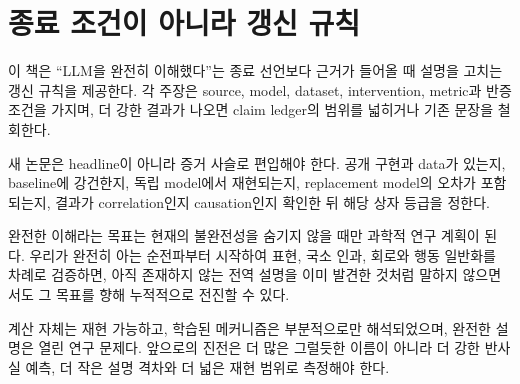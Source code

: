 \section{종료 조건이 아니라 갱신 규칙}

이 책은 ``LLM을 완전히 이해했다''는 종료 선언보다 근거가 들어올 때 설명을 고치는 갱신 규칙을 제공한다.
각 주장은 source, model, dataset, intervention, metric과 반증 조건을 가지며, 더 강한 결과가 나오면 claim ledger의 범위를 넓히거나 기존 문장을 철회한다.

새 논문은 headline이 아니라 증거 사슬로 편입해야 한다.
공개 구현과 data가 있는지, baseline에 강건한지, 독립 model에서 재현되는지, replacement model의 오차가 포함되는지, 결과가 correlation인지 causation인지 확인한 뒤 해당 상자 등급을 정한다.

완전한 이해라는 목표는 현재의 불완전성을 숨기지 않을 때만 과학적 연구 계획이 된다.
우리가 완전히 아는 순전파부터 시작하여 표현, 국소 인과, 회로와 행동 일반화를 차례로 검증하면, 아직 존재하지 않는 전역 설명을 이미 발견한 것처럼 말하지 않으면서도 그 목표를 향해 누적적으로 전진할 수 있다.

\begin{factbox}
계산 자체는 재현 가능하고, 학습된 메커니즘은 부분적으로만 해석되었으며, 완전한 설명은 열린 연구 문제다.
앞으로의 진전은 더 많은 그럴듯한 이름이 아니라 더 강한 반사실 예측, 더 작은 설명 격차와 더 넓은 재현 범위로 측정해야 한다.
\end{factbox}
